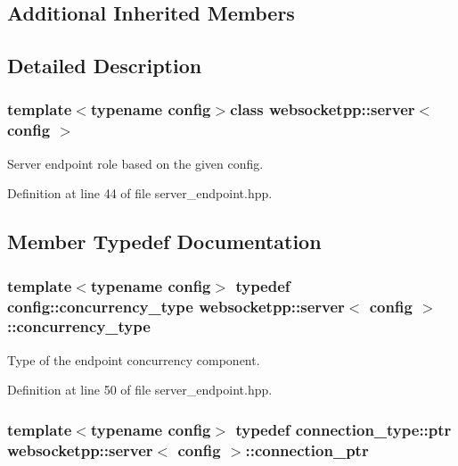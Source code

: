 \subsection*{Additional Inherited Members}


\subsection{Detailed Description}
\subsubsection*{template$<$typename config$>$class websocketpp\+::server$<$ config $>$}

Server endpoint role based on the given config. 

Definition at line 44 of file server\+\_\+endpoint.\+hpp.



\subsection{Member Typedef Documentation}
\hypertarget{classwebsocketpp_1_1server_ad389e3f96682b13a16f2bf01568eeabd}{}
\subsubsection[{concurrency\+\_\+type}]{\setlength{\rightskip}{0pt plus 5cm}template$<$typename config$>$ typedef config\+::concurrency\+\_\+type {\bf websocketpp\+::server}$<$ config $>$\+::{\bf concurrency\+\_\+type}}\label{classwebsocketpp_1_1server_ad389e3f96682b13a16f2bf01568eeabd}


Type of the endpoint concurrency component. 



Definition at line 50 of file server\+\_\+endpoint.\+hpp.

\hypertarget{classwebsocketpp_1_1server_a0b93f09ceae3d1dafd2f7b1da759c2ad}{}
\subsubsection[{connection\+\_\+ptr}]{\setlength{\rightskip}{0pt plus 5cm}template$<$typename config$>$ typedef {\bf connection\+\_\+type\+::ptr} {\bf websocketpp\+::server}$<$ config $>$\+::{\bf connection\+\_\+ptr}}\label{classwebsocketpp_1_1server_a0b93f09ceae3d1dafd2f7b1da759c2ad}


